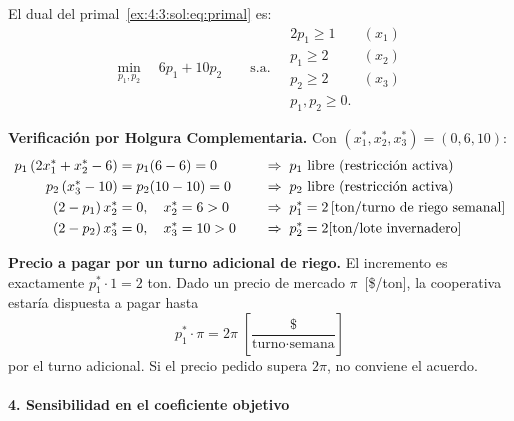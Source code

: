 El dual del primal~\eqref{ex:4:3:sol:eq:primal} es:
\begin{equation}
  \min_{p_1,p_2}\quad 6p_1+10p_2
  \qquad\text{s.a.}\quad
  \begin{array}{ll}
    2p_1\ge 1 & (x_1)\\
    p_1 \ge 2 & (x_2)\\
    p_2 \ge 2 & (x_3)\\
    p_1,p_2\ge 0.
  \end{array}
  \label{ex:4:3:sol:eq:dual}
\end{equation}

\textbf{Verificación por Holgura Complementaria.}
Con $(x_1^*,x_2^*,x_3^*)=(0,6,10)$:
\begin{alignat}{2}
  p_1\,(2x_1^*+x_2^*-6) &= p_1(6-6) = 0
    &\quad&\Rightarrow\; p_1 \text{ libre (restricción activa)} \notag\\
  p_2\,(x_3^*-10)        &= p_2(10-10) = 0
    &\quad&\Rightarrow\; p_2 \text{ libre (restricción activa)} \notag\\
  (2-p_1)\,x_2^*         &= 0,\quad x_2^*=6>0
    &\quad&\Rightarrow\; p_1^*=2 \, [\text{ton}/\text{turno de riego semanal}]\notag\\
  (2-p_2)\,x_3^*         &= 0,\quad x_3^*=10>0
    &\quad&\Rightarrow\; p_2^*=2 [\text{ton}/\text{lote invernadero}] \notag
\end{alignat}

\medskip
\textbf{Precio a pagar por un turno adicional de riego.}
El incremento es exactamente $p_1^*\cdot 1=2$ ton.
Dado un precio de mercado $\pi$~[\$/ton], la cooperativa estaría dispuesta
a pagar hasta
\[
  \boxed{p_1^*\cdot\pi = 2\pi\;\left[\frac{\$}{\text{turno}\cdot\text{semana}}\right]}
\]
por el turno adicional. Si el precio pedido supera $2\pi$, no conviene el acuerdo.\\

\paragraph{4.\; Sensibilidad en el coeficiente objetivo}

